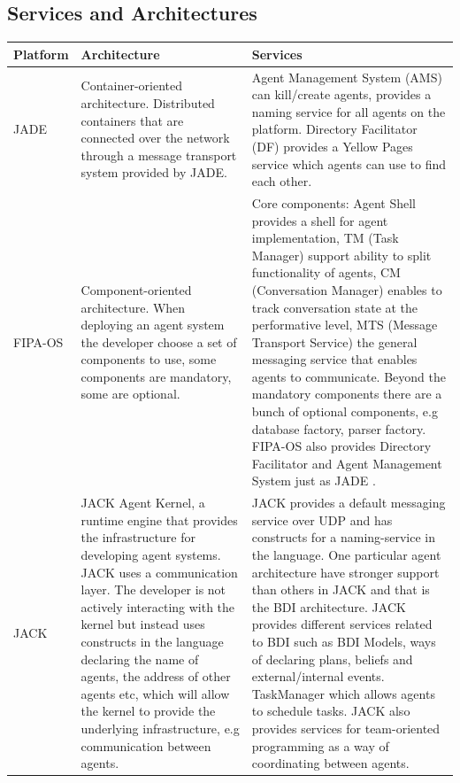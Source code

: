 \documentclass[paper=letter, fontsize=12pt]{article}
\begin{document}
\subsection{Services and Architectures}
\begin{tabular}{|p{2cm} p{6cm} p{6cm}|}
\hline
\textbf{Platform}  & \textbf{Architecture} & \textbf{Services} \\
\hline
JADE & Container-oriented architecture. Distributed containers that are connected over the network through a message transport system provided by JADE. \citep{jade-2}& Agent Management System (AMS) can kill/create agents, provides a naming service for all agents on the platform. Directory Facilitator (DF) provides a Yellow Pages service which agents can use to find each other.  \citep{jade-2}\\
\hline
FIPA-OS & Component-oriented architecture. When deploying an agent system the developer choose a set of components to use, some components are mandatory, some are optional. \citep{fipa-os-2}& Core components: Agent Shell provides a shell for agent implementation, TM (Task Manager) support ability to split functionality of agents, CM (Conversation Manager) enables to track conversation state at the performative level, MTS (Message Transport Service) the general messaging service that enables agents to communicate. Beyond the mandatory components there are a bunch of optional components, e.g database factory, parser factory. FIPA-OS also provides Directory Facilitator and Agent Management System just as JADE \citep{fipa-os-2}.\\
\hline
JACK  & JACK Agent Kernel, a runtime engine that provides the infrastructure for developing agent systems. JACK uses a communication layer. The developer is not actively interacting with the kernel but instead uses constructs in the language declaring the name of agents, the address of other agents etc, which will allow the kernel to provide the underlying infrastructure, e.g communication between agents. \citep{jack-2} & JACK provides a default messaging service over UDP and has constructs for a naming-service in the language. One particular agent architecture have stronger support than others in JACK and that is the BDI architecture. JACK provides different services related to BDI such as BDI Models, ways of declaring plans, beliefs and external/internal events. TaskManager which allows agents to schedule tasks. JACK also provides services for team-oriented programming as a way of coordinating between agents. \citep{luck_book}\\
\hline
\end{tabular}
\end{document}
